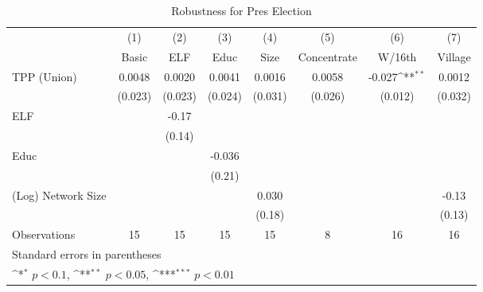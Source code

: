 \begin{table}[htbp]\centering
\def\sym#1{\ifmmode^{#1}\else\(^{#1}\)\fi}
\caption{Robustness for Pres Election\label{tablerobustnesspres}}
\begin{tabular}{l*{7}{c}}
\toprule
                &\multicolumn{1}{c}{(1)}&\multicolumn{1}{c}{(2)}&\multicolumn{1}{c}{(3)}&\multicolumn{1}{c}{(4)}&\multicolumn{1}{c}{(5)}&\multicolumn{1}{c}{(6)}&\multicolumn{1}{c}{(7)}\\
                &\multicolumn{1}{c}{Basic}&\multicolumn{1}{c}{ELF}&\multicolumn{1}{c}{Educ}&\multicolumn{1}{c}{Size}&\multicolumn{1}{c}{Concentrate}&\multicolumn{1}{c}{W/16th}&\multicolumn{1}{c}{Village}\\
\midrule
TPP (Union)     &   0.0048         &   0.0020         &   0.0041         &   0.0016         &   0.0058         &   -0.027\sym{**} &   0.0012         \\
                &  (0.023)         &  (0.023)         &  (0.024)         &  (0.031)         &  (0.026)         &  (0.012)         &  (0.032)         \\
ELF             &                  &    -0.17         &                  &                  &                  &                  &                  \\
                &                  &   (0.14)         &                  &                  &                  &                  &                  \\
Educ            &                  &                  &   -0.036         &                  &                  &                  &                  \\
                &                  &                  &   (0.21)         &                  &                  &                  &                  \\
(Log) Network Size&                  &                  &                  &    0.030         &                  &                  &    -0.13         \\
                &                  &                  &                  &   (0.18)         &                  &                  &   (0.13)         \\
\midrule
Observations    &       15         &       15         &       15         &       15         &        8         &       16         &       16         \\
\bottomrule
\multicolumn{8}{l}{\footnotesize Standard errors in parentheses}\\
\multicolumn{8}{l}{\footnotesize \sym{*} \(p<0.1\), \sym{**} \(p<0.05\), \sym{***} \(p<0.01\)}\\
\end{tabular}
\end{table}
